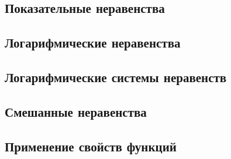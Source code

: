 \documentclass[10pt, a4paper]{article}
\begin{document}
	\subsection{Показательные неравенства}
	\subsection{Логарифмические неравенства}
	\subsection{Логарифмические системы неравенств}
	\subsection{Смешанные неравенства}
	\subsection{Применение свойств функций}
\end{document}
